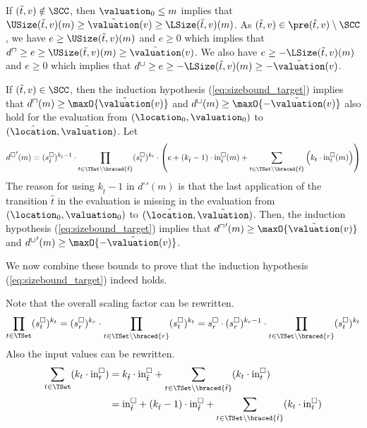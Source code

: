 If $(\tilde{t}, v) \notin \SCC$, then $\valuation_0 \leq m$ implies that $\USize(\tilde{t}, v)(m) \geq \tilde{\valuation}(v) \geq \LSize(\tilde{t}, v)(m)$.
As $(\tilde{t}, v) \in \pre(\hat{t}, v) \setminus \SCC$, we have $e \geq \USize(\tilde{t}, v)(m)$ and $e \geq 0$ which implies that $d^\sqcap \geq e \geq \USize(\tilde{t}, v)(m) \geq \tilde{\valuation}(v)$.
We also have $e \geq -\LSize(\tilde{t}, v)(m)$ and $e \geq 0$ which implies that $d^\sqcup \geq e \geq -\LSize(\tilde{t}, v)(m) \geq -\tilde{\valuation}(v)$.

If $(\tilde{t}, v) \in \SCC$, then the induction hypothesis (\ref{eq:sizebound_target}) implies that $d^\sqcap(m) \geq \maxO{\tilde{\valuation}(v)}$ and $d^\sqcup(m) \geq \maxO{-\tilde{\valuation}(v)}$ also hold for the evaluation from $(\location_0, \valuation_0)$ to $(\tilde{\location}, \tilde{\valuation})$.
Let
\begin{equation} \label{eq:induction_consequence}
  {d^\square}'(m) = (s^\square_{\hat{t}})^{k_{\hat{t}} - 1} \cdot \prod_{t \in \TSet \setminus \braced{\hat{t}}} (s^\square_t)^{k_t} \cdot \left( e + \left( k_{\hat{t}} - 1 \right) \cdot \text{in}^\square_{\hat{t}}(m) + \sum_{t \in \TSet \setminus \braced{\hat{t}}} \left( k_t \cdot \text{in}^\square_t(m) \right) \right)
\end{equation}
The reason for using $k_{\hat{t}} - 1$ in ${d^\square}'(m)$ is that the last application of the transition $\hat{t}$ in the evaluation is missing in the evaluation from $(\location_0, \valuation_0)$ to $(\tilde{\location}, \tilde{\valuation})$.
Then, the induction hypothesis (\ref{eq:sizebound_target}) implies that ${d^\sqcap}'(m) \geq \maxO{\tilde{\valuation}(v)}$ and ${d^\sqcup}'(m) \geq \maxO{-\tilde{\valuation}(v)}$.

We now combine these bounds to prove that the induction hypothesis (\ref{eq:sizebound_target}) indeed holds.

Note that the overall scaling factor can be rewritten.
\begin{equation} \label{eq:scaling_factor_reduction}
  \prod_{t \in \TSet} (s^\square_t)^{k_t} = (s^\square_r)^{k_r} \cdot \prod_{t \in \TSet \setminus \braced{r}} (s^\square_t)^{k_t} = s^\square_r \cdot (s^\square_r)^{k_r - 1} \cdot \prod_{t \in \TSet \setminus \braced{r}} (s^\square_t)^{k_t}
\end{equation}
Also the input values can be rewritten.
\begin{equation} \label{eq:input_reduction}
  \begin{split}
  \sum_{t \in \TSet} (k_t \cdot \text{in}^\square_t)
  & = k_{\hat{t}} \cdot \text{in}^\square_{\hat{t}} + \sum_{t \in \TSet \setminus \braced{\hat{t}}} (k_t \cdot \text{in}^\square_t) \\
  & = \text{in}^\square_{\hat{t}}
    + (k_{\hat{t}} - 1) \cdot \text{in}^\square_{\hat{t}}
    + \sum_{t \in \TSet \setminus \braced{\hat{t}}} (k_t \cdot \text{in}^\square_t)
  \end{split}
\end{equation}

